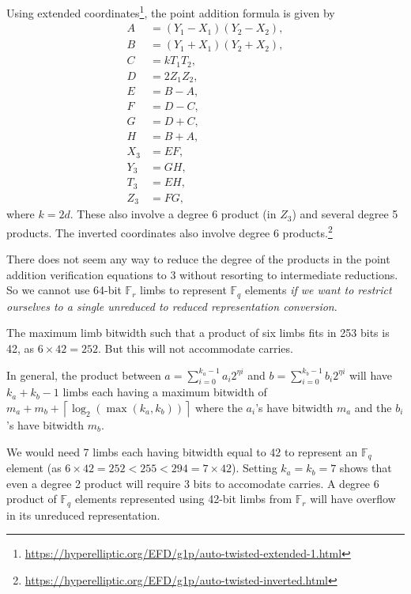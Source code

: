 \documentclass[a4paper, 12pt]{article}
\begin{document}
Using extended coordinates\footnote{\url{https://hyperelliptic.org/EFD/g1p/auto-twisted-extended-1.html}}, the point addition formula is given by
\begin{align*}
  A & = (Y_1-X_1)(Y_2-X_2),\\
  B & = (Y_1+X_1)(Y_2+X_2),\\
  C & = kT_1T_2,\\
  D & = 2Z_1Z_2,\\
  E & = B-A,\\
  F & = D-C,\\
  G & = D+C,\\
  H & = B+A,\\
  X_3 & = EF,\\
  Y_3 & = GH,\\
  T_3 & = EH,\\
  Z_3 & = FG,
\end{align*}
where $k=2d$. These also involve a degree 6 product (in $Z_3$) and several degree 5 products. The inverted coordinates also involve degree 6 products.\footnote{\url{https://hyperelliptic.org/EFD/g1p/auto-twisted-inverted.html}}

There does not seem any way to reduce the degree of the products in the point addition verification equations to 3 without resorting to intermediate reductions. So we cannot use 64-bit $\mathbb{F}_r$ limbs to represent $\mathbb{F}_q$ elements \textit{if we want to restrict ourselves to a single unreduced to reduced representation conversion}.

The maximum limb bitwidth such that a product of six limbs fits in 253 bits is 42, as $6\times 42 = 252$. But this will not accommodate carries.

In general, the product between $a = \sum_{i=0}^{k_a-1}a_i 2^{\eta i}$ and $b= \sum_{i=0}^{k_b-1}b_i 2^{\eta i}$ will have $k_a+k_b-1$ limbs each having a maximum bitwidth of $m_a+m_b+\left\lceil \log_2 \left( \max\left( k_a, k_b \right) \right) \right\rceil$ where the $a_i$'s have bitwidth $m_a$ and the $b_i$'s have bitwidth $m_b$.

We would need 7 limbs each having bitwidth equal to 42 to represent an $\mathbb{F}_q$ element (as $6\times 42 = 252 < 255 < 294 = 7\times 42$). Setting $k_a=k_b =7$ shows that even a degree 2 product will require 3 bits to accomodate carries. A degree 6 product of $\mathbb{F}_q$ elements represented using 42-bit limbs from $\mathbb{F}_r$ will have overflow in its unreduced representation.
\end{document}
